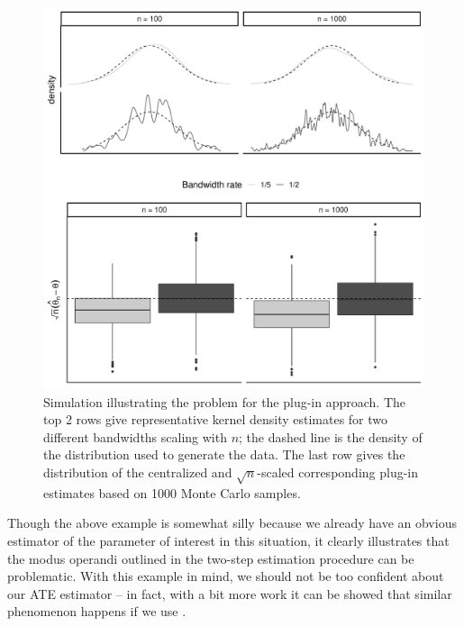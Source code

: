 \documentclass[a4,danish]{article}
\begin{document}
\begin{example}
  \begin{figure}[h]
    \centerline{\includegraphics[width=.75\linewidth]{./figures/kernel-undersmooth-viz-presentation-3.pdf}}
    \caption{Simulation illustrating the problem for the plug-in approach. The top 2 rows give
      representative kernel density estimates for two different bandwidths scaling with $n$; the
      dashed line is the density of the distribution used to generate the data. The last row gives
      the distribution of the centralized and $\sqrt{n}$-scaled corresponding plug-in estimates
      based on 1000 Monte Carlo samples.}
    \label{fig:kernel-undersmoothed}
  \end{figure} 
\end{example}

Though the above example is somewhat silly because we already have an obvious estimator of the
parameter of interest in this situation, it clearly illustrates that the modus operandi outlined in
the two-step estimation procedure can be problematic. With this example in mind, we should not be
too confident about our ATE estimator -- in fact, with a bit more work it can be showed that similar
phenomenon happens if we use .
\end{document}
